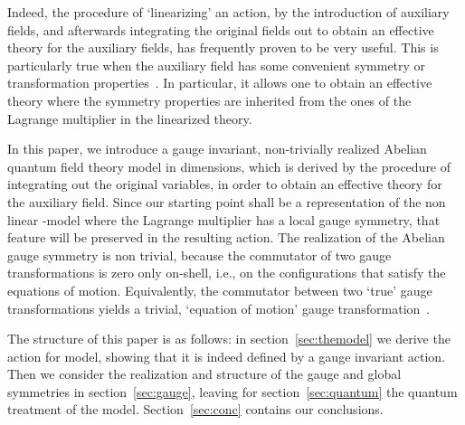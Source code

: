 \documentclass[a4paper,12pt]{article}
\begin{document}
Indeed, the procedure of `linearizing' an action, by the introduction
of auxiliary fields, and afterwards integrating the original fields
out to obtain an effective theory for the auxiliary fields, has
frequently proven to be very useful. This is particularly true when
the auxiliary field has some convenient symmetry or transformation
properties~\cite{rivers}.  In particular, it allows one to obtain an
effective theory where the symmetry properties are inherited from the
ones of the Lagrange multiplier in the linearized theory.


In this paper, we introduce a gauge invariant, non-trivially realized
Abelian quantum field theory model in \coordHE{} dimensions, which is
derived by the procedure of integrating out the original variables, in
order to obtain an effective theory for the auxiliary field. Since our
starting point shall be a representation of the non linear
\myHighlight{$\sigma$}\coordHE{}-model where the Lagrange multiplier has a local gauge
symmetry, that feature will be preserved in the resulting action.  The
realization of the Abelian gauge symmetry is non trivial, because the
commutator of two gauge transformations is zero only on-shell, i.e.,
on the configurations that satisfy the equations of motion.
Equivalently, the commutator between two `true' gauge transformations
yields a trivial, `equation of motion' gauge
transformation~\cite{deWit:1978cd,teit}.

The structure of this paper is as follows: in
section~\ref{sec:themodel} we derive the action for model, showing
that it is indeed defined by a gauge invariant action. Then we
consider the realization and structure of the gauge and global
symmetries in section~\ref{sec:gauge}, leaving for
section~\ref{sec:quantum} the quantum treatment of the model.
Section~\ref{sec:conc} contains our conclusions.
\end{document}
